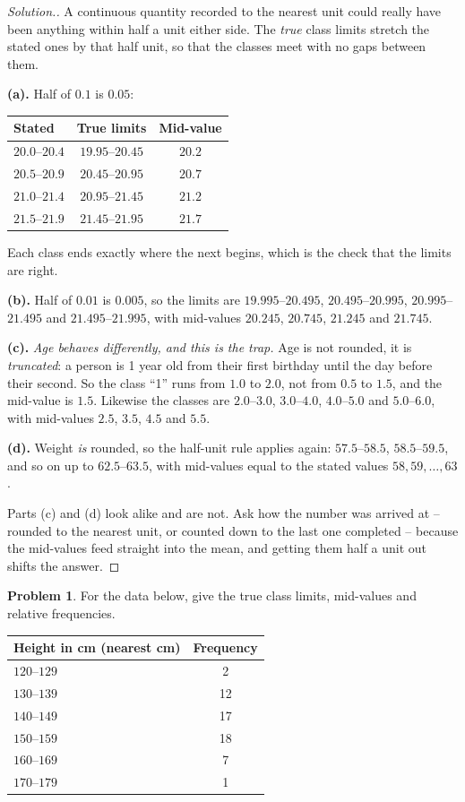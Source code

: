 \documentclass[11pt,a4paper]{article}
\theoremstyle{definition}
\newtheorem{problemx}{Problem}[section]
\newenvironment{problem}{\begin{problemx}}{\end{problemx}}
\newenvironment{solution}
  {\renewcommand{\qedsymbol}{}\begin{proof}[\textit{Solution}.]}
  {\end{proof}}
\begin{document}
\begin{solution}
A continuous quantity recorded to the nearest unit could really have been anything within
half a unit either side. The \emph{true} class limits stretch the stated ones by that half
unit, so that the classes meet with no gaps between them.

\textbf{(a).} Half of $0.1$ is $0.05$:
\begin{table}[H]
\centering
\begin{tabular}{lcc}
Stated & True limits & Mid-value\\
\hline
$20.0$--$20.4$ & $19.95$--$20.45$ & $20.2$\\
$20.5$--$20.9$ & $20.45$--$20.95$ & $20.7$\\
$21.0$--$21.4$ & $20.95$--$21.45$ & $21.2$\\
$21.5$--$21.9$ & $21.45$--$21.95$ & $21.7$\\
\end{tabular}
\end{table}
Each class ends exactly where the next begins, which is the check that the limits are
right.

\textbf{(b).} Half of $0.01$ is $0.005$, so the limits are $19.995$--$20.495$,
$20.495$--$20.995$, $20.995$--$21.495$ and $21.495$--$21.995$, with mid-values $20.245$,
$20.745$, $21.245$ and $21.745$.

\textbf{(c).} \emph{Age behaves differently, and this is the trap.} Age is not rounded, it
is \emph{truncated}: a person is 1 year old from their first birthday until the day before
their second. So the class ``1'' runs from $1.0$ to $2.0$, not from $0.5$ to $1.5$, and the
mid-value is $1.5$. Likewise the classes are $2.0$--$3.0$, $3.0$--$4.0$, $4.0$--$5.0$ and
$5.0$--$6.0$, with mid-values $2.5$, $3.5$, $4.5$ and $5.5$.

\textbf{(d).} Weight \emph{is} rounded, so the half-unit rule applies again: $57.5$--$58.5$,
$58.5$--$59.5$, and so on up to $62.5$--$63.5$, with mid-values equal to the stated values
$58, 59, \ldots, 63$.

Parts (c) and (d) look alike and are not. Ask how the number was arrived at -- rounded to
the nearest unit, or counted down to the last one completed -- because the mid-values feed
straight into the mean, and getting them half a unit out shifts the answer.
\end{solution}

\begin{problem}
For the data below, give the true class limits, mid-values and relative frequencies.
\begin{table}[H]
\centering
\begin{tabular}{lc}
Height in cm (nearest cm) & Frequency\\
\hline
$120$--$129$ & 2\\
$130$--$139$ & 12\\
$140$--$149$ & 17\\
$150$--$159$ & 18\\
$160$--$169$ & 7\\
$170$--$179$ & 1\\
\end{tabular}
\end{table}
\end{problem}
\end{document}

